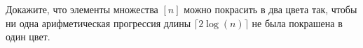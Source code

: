 Докажите, что элементы множества $[n]$ можно покрасить в два цвета так, чтобы ни одна арифметическая прогрессия длины
$\lceil 2 \log(n) \rceil$ не была покрашена в один цвет.